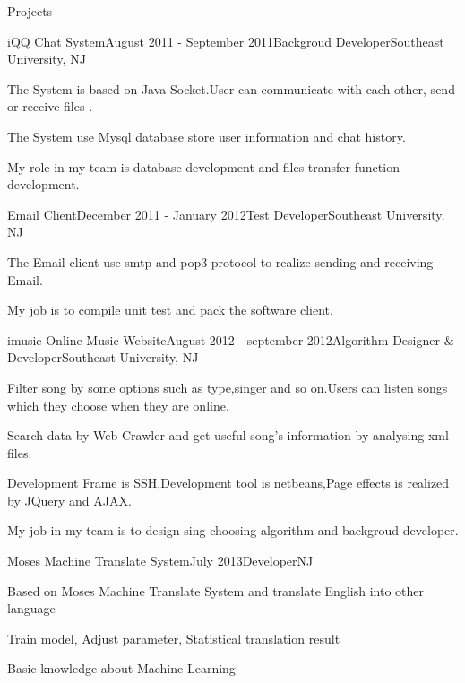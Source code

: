 \documentclass{resume} %
\begin{document}
\begin{rSection}{Projects}

\begin{rSubsection}{iQQ Chat System}{August 2011 - September 2011}{Backgroud Developer}{Southeast University, NJ}
\item The System is based on Java Socket.User can communicate with each other, send or receive files .
\item The System use Mysql database store user information and chat history.
\item My role in my team is database development and files transfer function development.
\end{rSubsection}


\begin{rSubsection}{Email Client}{December 2011 - January 2012}{Test Developer}{Southeast University, NJ}
\item The Email client use smtp and pop3 protocol to realize sending and receiving Email.
\item My job is to compile unit test and pack the software client.
\end{rSubsection}


\begin{rSubsection}{imusic Online Music Website}{August 2012 - september 2012}{Algorithm Designer \& Developer}{Southeast University, NJ}
\item Filter song by some options such as type,singer and so on.Users can listen songs which they choose when they are online.
\item Search data by Web Crawler and get useful song's information by analysing xml files.
\item Development Frame is SSH,Development tool is netbeans,Page effects is realized by JQuery and AJAX.
\item My job in my team is to design sing choosing algorithm and backgroud developer.
\end{rSubsection}


\begin{rSubsection}{Moses Machine Translate System}{July 2013}{Developer}{NJ}
\item Based on Moses Machine Translate System and translate English into other language
\item Train model, Adjust parameter, Statistical translation result
\item Basic knowledge about Machine Learning
\end{rSubsection}

\end{rSection}
\end{document}

